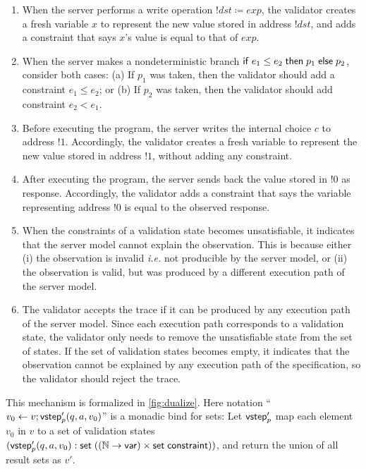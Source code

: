 \begin{enumerate}
\item \label{rule:write} When the server performs a write operation
  $!dst\coloneqq exp$, the validator creates a fresh variable $x$ to represent
  the new value stored in address $!dst$, and adds a constraint that says $x$'s
  value is equal to that of $exp$.
\item \label{rule:branch} When the server makes a nondeterministic branch $\mathsf{if}\;
  e_1\le e_2\;\mathsf{then}\; p_1\;\mathsf{else}\; p_2$, consider both cases: (a) If $p_1$ was taken,
  then the validator should add a constraint $e_1\le e_2$; or (b) If $p_2$ was
  taken, then the validator should add constraint $e_2<e_1$.
\item \label{rule:choice} Before executing the program, the server writes the internal
    choice $c$ to address $!1$.  Accordingly, the validator creates a fresh
    variable to represent the new value stored in address $!1$, without adding
    any constraint.
\item \label{rule:return} After executing the program, the server sends back the
  value stored in $!0$ as response.  Accordingly, the validator adds a
  constraint that says the variable representing address $!0$ is equal to the
  observed response.
\item \label{rule:unsat} When the constraints of a validation state becomes
  unsatisfiable, it indicates that the server model cannot explain the
  observation.  This is because either (i) the observation is invalid {\it i.e.}
  not producible by the server model, or (ii) the observation is valid, but was
  produced by a different execution path of the server model.
\item \label{rule:reject} The validator accepts the trace if it can be produced
  by any execution path of the server model.  Since each execution path
  corresponds to a validation state, the validator only needs to remove the
  unsatisfiable state from the set of states.  If the set of validation states
  becomes empty, it indicates that the observation cannot be explained by any
  execution path of the specification, so the validator should reject the trace.
\end{enumerate}

This mechanism is formalized in \autoref{fig:dualize}.  Here notation
``$v_0\gets v;\mathsf{vstep}'_p(q,a,v_0)$'' is a monadic bind for sets: Let $\mathsf{vstep}'_p$
map each element $v_0$ in $v$ to a set of validation states
$(\mathsf{vstep}'_p(q,a,v_0):\mathsf{set}\;((\mathbb N\to\mathsf{var})\times\mathsf{set}\;\mathsf{constraint}))$, and return the
union of all result sets as $v'$.

